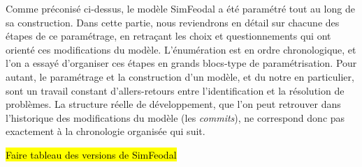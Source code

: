 Comme préconisé ci-dessus, le modèle SimFeodal a été paramétré tout au long de sa construction.
Dans cette partie, nous reviendrons en détail sur chacune des étapes de ce paramétrage, en retraçant les choix et questionnements qui ont orienté ces modifications du modèle.
L'énumération est en ordre chronologique, et l'on a essayé d'organiser ces étapes en grands blocs-type de paramétrisation.
Pour autant, le paramétrage et la construction d'un modèle, et du notre en particulier, sont un travail constant d'allers-retours entre l'identification et la résolution de problèmes.
La structure réelle de développement, que l'on peut retrouver dans l'historique des modifications du modèle (les \og \textit{commits}\fg{}), ne correspond donc pas exactement à la chronologie organisée qui suit.

\begin{center}
	\hl{Faire tableau des versions de SimFeodal}
\end{center}

